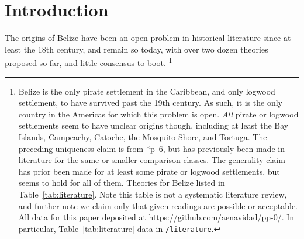
%
%
%
%
\section{Introduction}
\label{s:intro}
	The origins of Belize have been an open problem in historical literature since at least the 18th century, and remain so today, with over two dozen theories proposed so far, and little consensus to boot.%
	\footnote{Belize is the only pirate settlement in the Caribbean, and only logwood settlement, to have survived past the 19th century. As such, it is the only country in the Americas for which this problem is open. \emph{All} pirate or logwood settlements seem to have unclear origins though, including at least the Bay Islands, Campeachy, Catoche, the Mosquito Shore, and Tortuga. The preceding uniqueness claim is from \cite{res19}*{p~6}, but has previously been made in literature for the same or smaller comparison classes. The generality claim has prior been made for at least some pirate or logwood settlements, but seems to hold for all of them. Theories for Belize listed in Table~\ref{tab:literature}. Note this table is not a systematic literature review, and further note we claim only that given readings are possible or acceptable. All data for this paper deposited at \url{https://github.com/aenavidad/pp-0/}. In particular, Table~\ref{tab:literature} data in \href{https://github.com/aenavidad/pp-0/tree/main/literature}{\nolinkurl{/literature}}.}
	
